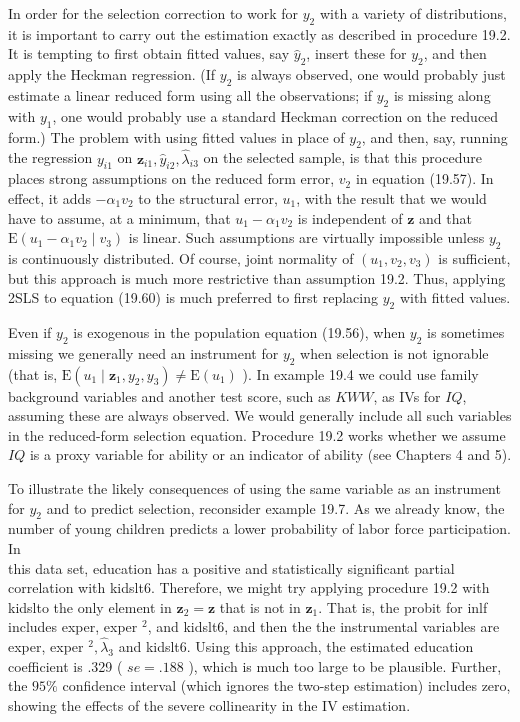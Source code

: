 \documentclass[10pt]{article}
\begin{document}
In order for the selection correction to work for $y_{2}$ with a variety of distributions, it is important to carry out the estimation exactly as described in procedure 19.2. It is tempting to first obtain fitted values, say $\hat{y}_{2}$, insert these for $y_{2}$, and then apply the Heckman regression. (If $y_{2}$ is always observed, one would probably just estimate a linear reduced form using all the observations; if $y_{2}$ is missing along with $y_{1}$, one would probably use a standard Heckman correction on the reduced form.) The problem with using fitted values in place of $y_{2}$, and then, say, running the regression $y_{i 1}$ on $\mathbf{z}_{i 1}, \hat{y}_{i 2}, \hat{\lambda}_{i 3}$ on the selected sample, is that this procedure places strong assumptions on the reduced form error, $v_{2}$ in equation (19.57). In effect, it adds $-\alpha_{1} v_{2}$ to the structural error, $u_{1}$, with the result that we would have to assume, at a minimum, that $u_{1}-\alpha_{1} v_{2}$ is independent of $\mathbf{z}$ and that $\mathrm{E}\left(u_{1}-\alpha_{1} v_{2} \mid v_{3}\right)$ is linear. Such assumptions are virtually impossible unless $y_{2}$ is continuously distributed. Of course, joint normality of $\left(u_{1}, v_{2}, v_{3}\right)$ is sufficient, but this approach is much more restrictive than assumption 19.2. Thus, applying 2SLS to equation (19.60) is much preferred to first replacing $y_{2}$ with fitted values.

Even if $y_{2}$ is exogenous in the population equation (19.56), when $y_{2}$ is sometimes missing we generally need an instrument for $y_{2}$ when selection is not ignorable (that is, $\mathrm{E}\left(u_{1} \mid \mathbf{z}_{1}, y_{2}, y_{3}\right) \neq \mathrm{E}\left(u_{1}\right)$ ). In example 19.4 we could use family background variables and another test score, such as $K W W$, as IVs for $I Q$, assuming these are always observed. We would generally include all such variables in the reduced-form selection equation. Procedure 19.2 works whether we assume $I Q$ is a proxy variable for ability or an indicator of ability (see Chapters 4 and 5).

To illustrate the likely consequences of using the same variable as an instrument for $y_{2}$ and to predict selection, reconsider example 19.7. As we already know, the number of young children predicts a lower probability of labor force participation. In\\
this data set, education has a positive and statistically significant partial correlation with kidslt6. Therefore, we might try applying procedure 19.2 with kidslto the only element in $\mathbf{z}_{2}=\mathbf{z}$ that is not in $\mathbf{z}_{1}$. That is, the probit for inlf includes exper, exper ${ }^{2}$, and kidslt6, and then the the instrumental variables are exper, exper ${ }^{2}, \hat{\lambda}_{3}$ and kidslt6. Using this approach, the estimated education coefficient is .329 ( $s e=.188$ ), which is much too large to be plausible. Further, the $95 \%$ confidence interval (which ignores the two-step estimation) includes zero, showing the effects of the severe collinearity in the IV estimation.
\end{document}
